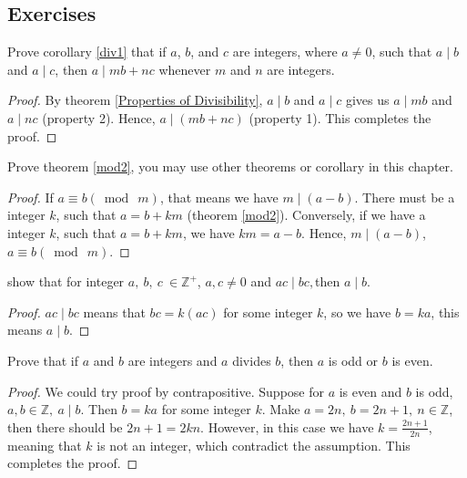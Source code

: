    \subsection{Exercises}
    \begin{exercise}
        Prove corollary \ref{div1} that if $a$, $b$, and $c$ are integers, where $a\neq 0$, such that $a\mid b$ and $a\mid c$, then $a\mid mb + nc$ whenever $m$ and $n$ are integers.
    \end{exercise}
    \begin{proof}
        By theorem \ref{Properties of Divisibility}, $a\mid b$ and $a\mid c$ gives us $a\mid mb$
        and $a\mid nc$ (property 2). Hence, $a\mid (mb+nc)$ (property 1). This completes the proof.
    \end{proof}

    \begin{exercise}
        Prove theorem \ref{mod2}, you may use other theorems or corollary in this chapter.
    \end{exercise}
    \begin{proof}
        If $a \equiv b (\bmod \ m)$, that means we have $m\mid(a-b)$. There must be a integer $k$, such that $a = b + km$ (theorem \ref{mod2}). Conversely, if we have a integer $k$, such that $a = b+km$, we have $km = a-b$. Hence, $m\mid(a-b)$, $a \equiv b (\bmod \ m)$.
    \end{proof}
    \begin{exercise}
        show that for integer $\displaystyle a,\ b,\ c\ \in \mathbb{Z}^{+}$, $\displaystyle a,c\neq 0$ and $\displaystyle ac\mid bc,$then $\displaystyle a\mid b$.
    \end{exercise}
    \begin{proof}
        $\displaystyle ac\mid bc$ means that $\displaystyle bc=k( ac)$ for some integer $\displaystyle k$, so we have $\displaystyle b=ka$, this means $\displaystyle a\mid b$.
    \end{proof}
    \begin{exercise}
        Prove that if $\displaystyle a$ and $\displaystyle b$ are integers and $\displaystyle a$ divides $\displaystyle b$, then $\displaystyle a$ is odd or $\displaystyle b$ is even.
    \end{exercise}
    \begin{proof}
        We could try proof by contrapositive. Suppose for $\displaystyle a$ is even and $\displaystyle b$ is odd, 
        $\displaystyle a,b\in \mathbb{Z} ,\ a\mid b$. Then $\displaystyle b=ka$ for some integer $\displaystyle k$. 
        Make $\displaystyle a=2n,\ b=2n+1,\ n\in \mathbb{Z}$, then there should be $\displaystyle 2n+1=2kn$. 
        However, in this case we have $\displaystyle k=\frac{2n+1}{2n}$, meaning that $\displaystyle k$ is not an 
        integer, which contradict the assumption. This completes the proof.
    \end{proof}
